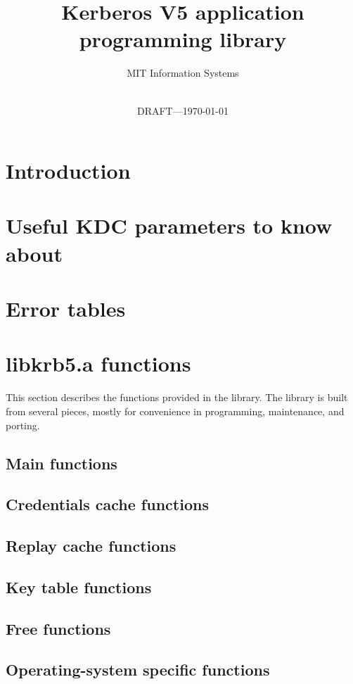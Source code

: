\documentclass[twoside]{article}
\title{\Huge Kerberos V5 application programming library}
\date{\ifdraft \\ {\Large DRAFT---}\fi\today}
\author{MIT Information Systems}
\newif\ifdraft
\begin{document}
\maketitle
\tableofcontents


\section{Introduction}


\section{Useful KDC parameters to know about}


\section{Error tables}


\newpage

\section{libkrb5.a functions}
This section describes the functions provided in the 
library.  The library is built from several pieces, mostly for convenience in
programming, maintenance, and porting.

\ifdraft\sloppy\fi

\subsection{Main functions}


\subsection{Credentials cache functions}


\subsection{Replay cache functions}


\subsection{Key table functions}


\subsection{Free functions}


\subsection{Operating-system specific functions}


\appendix
\cleardoublepage
\printindex
\end{document}
